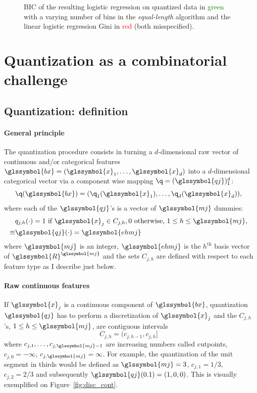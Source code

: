 \begin{figure}[!ht]
\centering \resizebox{.8\textwidth}{!}{}
\caption{\label{fig:bic_sin} BIC of the resulting logistic regression on quantized data in \textcolor{green}{green} with a varying number of bins in the \textit{equal-length} algorithm and the linear logistic regression Gini in \textcolor{red}{red} (both misspecified).}
\end{figure}


 
\section{Quantization as a combinatorial challenge} \label{sec:model_selection}

\subsection{Quantization: definition}

\paragraph{General principle}

The quantization procedure consists in turning a $d$-dimensional raw vector of continuous and/or categorical features $\glssymbol{bx} = (\glssymbol{x}_1, \ldots, \glssymbol{x}_d)$ into a $d$-dimensional categorical vector via a component wise mapping $\q=(\glssymbol{qj})_1^d$:
\[\q(\glssymbol{bx})=(\q_1(\glssymbol{x}_1),\ldots,\q_d(\glssymbol{x}_d)),\]
where each of the $\glssymbol{qj}$'s is a vector of $\glssymbol{mj}$ dummies: 
\begin{align*}\label{eq:qj}
& q_{j,h}(\cdot) =  1 \text{ if } \glssymbol{x}_j \in C_{j,h}, 0 \text{ otherwise, } 1 \leq h \leq \glssymbol{mj}, \\
\equiv & \glssymbol{qj}(\cdot) = \glssymbol{ehmj} \nonumber
\end{align*}
where $\glssymbol{mj}$ is an integer, $\glssymbol{ehmj}$ is the $h^{\text{th}}$ basis vector of $\glssymbol{R}^{\glssymbol{mj}}$ and the sets $C_{j,h}$ are defined with respect to each feature type as I describe just below.
\paragraph{Raw continuous features} If $\glssymbol{x}_j$ is a continuous component of $\glssymbol{bx}$, quantization $\glssymbol{qj}$ has to perform a discretization of $\glssymbol{x}_j$ and the $C_{j,h}$'s, $1 \leq h \leq \glssymbol{mj}$, are contiguous intervals  
\begin{equation}\label{eq:Cjhcont}
C_{j,h}=(c_{j,h-1},c_{j,h}]
\end{equation}
where $c_{j,1},\ldots,c_{j,\glssymbol{mj}-1}$ are increasing numbers called cutpoints, $c_{j,0}=-\infty$, $c_{j,\glssymbol{mj}}=\infty$. For example, the quantization of the unit segment in thirds would be defined as $\glssymbol{mj}=3$, $c_{j,1} = 1/3$, $c_{j,2} = 2/3$ and subsequently $\glssymbol{qj}(0.1) = (1,0,0)$. This is visually exemplified on Figure~\ref{fig:disc_cont}.
